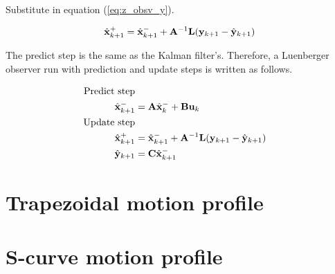 Substitute in equation (\ref{eq:z_obsv_y}).

\begin{equation*}
  \hat{\mathbf{x}}_{k+1}^+ = \hat{\mathbf{x}}_{k+1}^- + \mathbf{A}^{-1}\mathbf{L}
    (\mathbf{y}_{k+1} - \hat{\mathbf{y}}_{k+1})
\end{equation*}

The predict step is the same as the Kalman filter's. Therefore, a Luenberger
observer run with prediction and update steps is written as follows.

\begin{align}
  \text{Predict step} \nonumber \\
  \hat{\mathbf{x}}_{k+1}^- &= \mathbf{A}\hat{\mathbf{x}}_k^- + \mathbf{B}\mathbf{u}_k \\
  \text{Update step} \nonumber \\
  \hat{\mathbf{x}}_{k+1}^+ &= \hat{\mathbf{x}}_{k+1}^- + \mathbf{A}^{-1}\mathbf{L}
    (\mathbf{y}_{k+1} - \hat{\mathbf{y}}_{k+1}) \\
  \hat{\mathbf{y}}_{k+1} &= \mathbf{C} \hat{\mathbf{x}}_{k+1}^-
\end{align}

\section{Trapezoidal motion profile}
\label{sec:deriv-trapezoid-profile}

\section{S-curve motion profile}
\label{sec:deriv-s-curve-profile}
